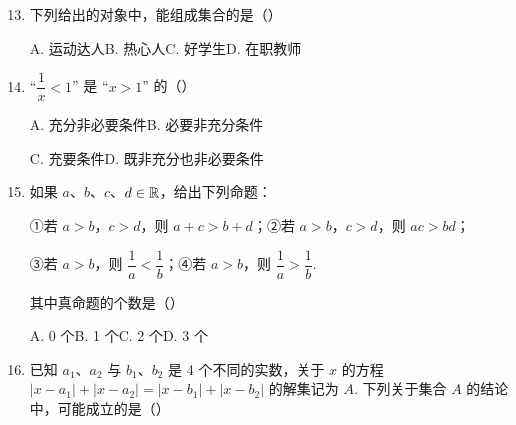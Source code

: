 \needvspace{7cm}

\begin{enumerate}
\setcounter{enumi}{12}

\item 下列给出的对象中，能组成集合的是\mbox{（\quad）}

\keepwithprev
A. 运动达人\qquad B. 热心人\qquad C. 好学生\qquad D. 在职教师

\ifanswer
\solbegin
{}
\solend
\fi

\item “$\dfrac{1}{x}<1$” 是 “$x>1$” 的\mbox{（\quad）}

\keepwithprev
A. 充分非必要条件\qquad\qquad B. 必要非充分条件

C. 充要条件\qquad\qquad D. 既非充分也非必要条件

\ifanswer
\solbegin
{}
\solend
\fi

\item 如果 $a$、$b$、$c$、$d\in\mathbb{R}$，给出下列命题：

①若 $a>b$，$c>d$，则 $a+c>b+d$；②若 $a>b$，$c>d$，则 $ac>bd$；

③若 $a>b$，则 $\dfrac{1}{a}<\dfrac{1}{b}$；④若 $a>b$，则 $\dfrac{1}{a}>\dfrac{1}{b}$.

其中真命题的个数是\mbox{（\quad）}

\keepwithprev
A. 0 个\qquad B. 1 个\qquad C. 2 个\qquad D. 3 个

\ifanswer
\solbegin
{}
\solend
\fi

\item 已知 $a_1$、$a_2$ 与 $b_1$、$b_2$ 是 4 个不同的实数，关于 $x$ 的方程 $\lvert x-a_1\rvert+\lvert x-a_2\rvert=\lvert x-b_1\rvert+\lvert x-b_2\rvert$ 的解集记为 $A$. 下列关于集合 $A$ 的结论中，可能成立的是\mbox{（\quad）}


\end{enumerate}
